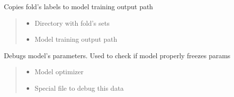 \documentclass[letterpaper,10pt,english]{sphinxmanual}
\begin{document}
\begin{fulllineitems}
\begin{fulllineitems}
\label{\detokenize{net:net.UVANEMO.__copy_loaders}}
\pysigstartsignatures
{}
\pysigstopsignatures
\sphinxAtStartPar
Copies fold’s labels to model training output path
\begin{quote}\begin{description}
\begin{itemize}
\item {} 
\sphinxAtStartPar
{} \textendash{} Directory with fold’s sets

\item {} 
\sphinxAtStartPar
{} \textendash{} Model training output path

\end{itemize}

\end{description}\end{quote}

\end{fulllineitems}


\begin{fulllineitems}
\label{\detokenize{net:net.UVANEMO.__debug_params}}
\pysigstartsignatures
{}
\pysigstopsignatures
\sphinxAtStartPar
Debugs model’s parameters. Used to check if model properly freezes params
\begin{quote}\begin{description}
\begin{itemize}
\item {} 
\sphinxAtStartPar
{} \textendash{} Model optimizer

\item {} 
\sphinxAtStartPar
{} \textendash{} Special file to debug this data

\end{itemize}


\end{description}
\end{quote}
\end{fulllineitems}
\end{fulllineitems}
\end{document}
